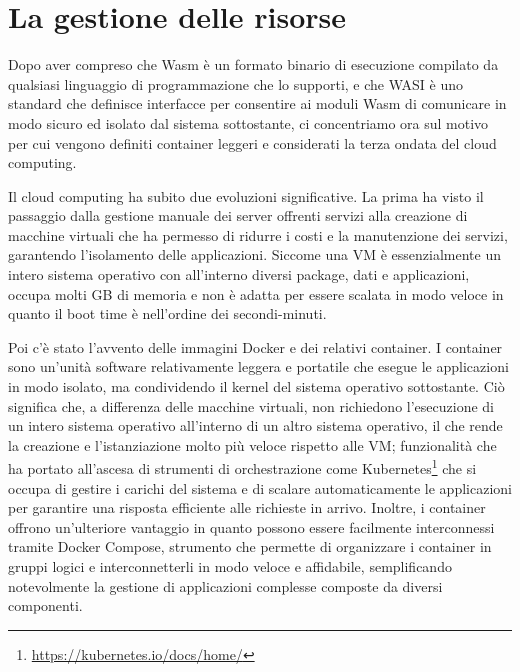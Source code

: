 
\section{La gestione delle risorse}
Dopo aver compreso che Wasm è un formato binario di esecuzione compilato da qualsiasi linguaggio di programmazione che
lo supporti, e che WASI è uno standard che definisce interfacce per consentire ai moduli Wasm di comunicare in modo
sicuro ed isolato dal sistema sottostante, ci concentriamo ora sul motivo per cui vengono definiti container leggeri e
considerati la terza ondata del cloud computing.

Il cloud computing ha subito due evoluzioni significative. La prima ha visto il passaggio dalla gestione manuale dei
server offrenti servizi alla creazione di macchine virtuali che ha permesso di ridurre i costi e la manutenzione dei
servizi, garantendo l'isolamento delle applicazioni. Siccome una VM è essenzialmente un intero sistema operativo con
all'interno diversi package, dati e applicazioni, occupa molti GB di memoria e non è adatta per essere scalata in modo
veloce in quanto il boot time è nell'ordine dei secondi-minuti.

Poi c'è stato l'avvento delle immagini Docker e dei relativi container. I container sono un'unità software relativamente
leggera e portatile che esegue le applicazioni in modo isolato, ma condividendo il kernel del sistema operativo
sottostante. Ciò significa che, a differenza delle macchine virtuali, non richiedono l'esecuzione di un intero sistema
operativo all'interno di un altro sistema operativo, il che rende la creazione e l'istanziazione molto più veloce
rispetto alle VM; funzionalità che ha portato all'ascesa di strumenti di orchestrazione come
Kubernetes\footnote{\url{https://kubernetes.io/docs/home/}} che si occupa di gestire i carichi del sistema e di scalare
automaticamente le applicazioni per garantire una risposta efficiente alle richieste in arrivo. Inoltre, i container
offrono un'ulteriore vantaggio in quanto possono essere facilmente interconnessi tramite Docker Compose, strumento che
permette di organizzare i container in gruppi logici e interconnetterli in modo veloce e affidabile, semplificando
notevolmente la gestione di applicazioni complesse composte da diversi componenti.

